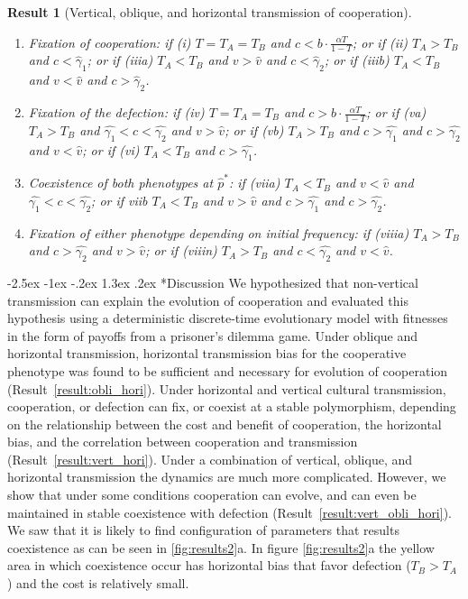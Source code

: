 \documentclass[12pt]{extarticle}
\makeatletter
\renewcommand\section{\@startsection {section}{1}{\z@}%
     {-2.5ex \@plus -1ex \@minus -.2ex}%
     {1.3ex \@plus.2ex}%
    {\Large\bfseries}}
\newtheorem{result}{Result}
\makeatother
\begin{document}
{\begin{result}[Vertical, oblique, and horizontal transmission of cooperation]
\begin{enumerate}
\item \emph{Fixation of cooperation}: 
	if \emph{(i)} $T=T_A=T_B$ and $c < b\cdot \frac{\alpha T}{1-T}$; or
	if \emph{(ii)} $T_A>T_B$ and $c < \hat\gamma_1$; or 
	if \emph{(iiia)} $T_A<T_B$ and $v>\hat v$ and $c < \hat\gamma_2$; or
	if \emph{(iiib)} $T_A<T_B$ and $v<\hat v$ and $c > \hat\gamma_2$.
\item \emph{Fixation of the defection}: 
	if \emph{(iv)}  $T=T_A=T_B$ and $c > b\cdot \frac{\alpha T}{1-T}$; or 
  if \emph{(va)} $T_A>T_B$ and $\hat{\gamma_1} < c < \hat{\gamma_2}$ and $v>\hat{v}$; or 
  if \emph{(vb)} $T_A>T_B$ and $ c > \hat{\gamma_1} $ and $ c > \hat{\gamma_2}$ and $v<\hat{v}$; or 
	if \emph{(vi)} $T_A<T_B$ and $c>\hat{\gamma_1}$.
\item \emph{Coexistence of both phenotypes at $\hat{p}^*$}: 
  if \emph{(viia)} $T_A < T_B$ and $v<\hat{v}$ and $\hat{\gamma_1}<c<\hat{\gamma_2}$; or
  if \emph{viib} $T_A < T_B$ and $v>\hat{v}$ and $c>\hat{\gamma_1}$ and $c>\hat{\gamma_2}$. %
\item \emph{Fixation of either phenotype depending on initial frequency}:
  if \emph{(viiia)}  $T_A>T_B$ and $c > \hat{\gamma_2}$ and $v>\hat{v}$; or
  if \emph{(viiin)}  $T_A>T_B$ and $c < \hat{\gamma_2}$ and $v<\hat{v}$.
\end{enumerate}
\end{result}



\section*{Discussion}
We hypothesized that non-vertical transmission can explain the evolution of cooperation and evaluated this hypothesis using a deterministic discrete-time evolutionary model with fitnesses in the form of payoffs from a prisoner's dilemma game.
Under oblique and horizontal transmission, horizontal transmission bias for the cooperative phenotype was found to be sufficient and necessary for evolution of cooperation (Result~\autoref{result:obli_hori}).
Under horizontal and vertical cultural transmission, cooperation, or defection can fix, or coexist at a stable polymorphism, depending on the relationship between the cost and benefit of cooperation, the horizontal bias, and the correlation between cooperation and transmission (Result~\autoref{result:vert_hori}).
Under a combination of vertical, oblique, and horizontal transmission the dynamics are much more complicated. However, we show that under some conditions cooperation can evolve, and can even be maintained in stable coexistence with defection (Result~\autoref{result:vert_obli_hori}).
We saw that it is likely to find configuration of parameters that results coexistence as can be seen in \autoref{fig:results2}a. In figure \autoref{fig:results2}a the yellow area in which coexistence occur has horizontal bias that favor defection ($T_B>T_A$) and the cost is relatively small. 

}
\end{document}
